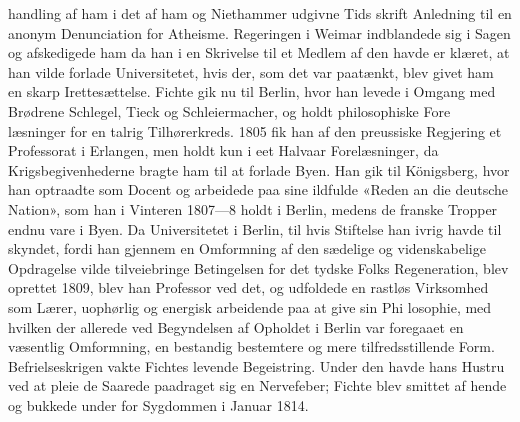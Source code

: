 \documentclass[12pt,a4paper]{book}
\begin{document}
handling af ham i det af ham og Niethammer udgivne Tids\-%
skrift Anledning til en anonym Denunciation for Atheisme.
Regeringen i Weimar indblandede sig i Sagen og afskedigede
ham da han i en Skrivelse til et Medlem af den havde er\-%
klæret, at han vilde forlade Universitetet, hvis der, som det
var paatænkt, blev givet ham en skarp Irettesættelse. Fichte
gik nu til Berlin, hvor han levede i Omgang med Brødrene
Schlegel, Tieck og Schleiermacher, og holdt philosophiske Fore\-%
læsninger for en talrig Tilhørerkreds. 1805 fik han af den
preussiske Regjering et Professorat i Erlangen, men holdt kun
i eet Halvaar Forelæsninger, da Krigsbegivenhederne bragte
ham til at forlade Byen. Han gik til Königsberg, hvor han
optraadte som Docent og arbeidede paa sine ildfulde «Reden
an die deutsche Nation», som han i Vinteren 1807---8 holdt i
Berlin, medens de franske Tropper endnu vare i Byen. Da
Universitetet i Berlin, til hvis Stiftelse han ivrig havde til\-%
skyndet, fordi han gjennem en Omformning af den sædelige
og videnskabelige Opdragelse vilde tilveiebringe Betingelsen for
det tydske Folks Regeneration, blev oprettet 1809, blev han
Professor ved det, og udfoldede en rastløs Virksomhed som
Lærer, uophørlig og energisk arbeidende paa at give sin Phi\-%
losophie, med hvilken der allerede ved Begyndelsen af Opholdet
i Berlin var foregaaet en væsentlig Omformning, en bestandig
bestemtere og mere tilfredsstillende Form. Befrielseskrigen
vakte Fichtes levende Begeistring. Under den havde hans
Hustru ved at pleie de Saarede paadraget sig en Nervefeber;
Fichte blev smittet af hende og bukkede under for Sygdommen
i Januar 1814.
\end{document}
